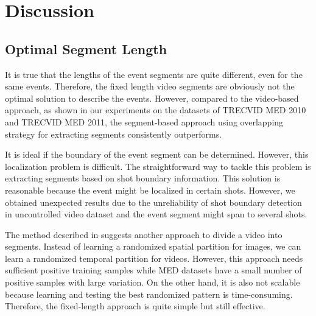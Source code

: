 \section{Discussion}
\label{discussion}
\subsection{Optimal Segment Length} 
It is true that the lengths of the event segments are quite different, even for the same events. Therefore, the fixed length video segments are obviously not the optimal solution to describe the events. However, compared to the video-based approach, as shown in our experiments on the datasets of TRECVID MED 2010 and TRECVID MED 2011, the segment-based approach using overlapping strategy for extracting segments consistently outperforms.

It is ideal if the boundary of the event segment can be determined. However, this localization problem is difficult. The straightforward way to tackle this problem is extracting segments based on shot boundary information. This solution is reasonable because the event might be localized in certain shots. However, we obtained unexpected results due to the unreliability of shot boundary detection in uncontrolled video dataset and the event segment might span to several shots.

The method described in \cite{DBLP:conf/eccv/JiangYY12} suggests another approach to divide a video into segments. Instead of learning a randomized spatial partition for images, we can learn a randomized temporal partition for videos. However, this approach needs sufficient positive training samples while MED datasets have a small number of positive samples with large variation. On the other hand, it is also not scalable because learning and testing the best randomized pattern is time-consuming. Therefore, the fixed-length approach is quite simple but still effective.

